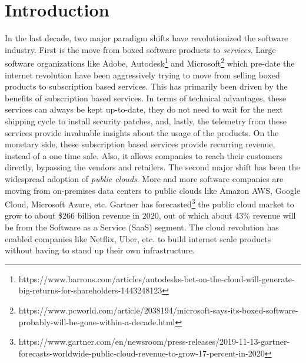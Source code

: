 \section{Introduction}
In the last decade, two major paradigm shifts have revolutionized the software industry. First is the move from boxed software products to \emph{services}. Large software organizations like Adobe\iffalse\footnote{https://producthabits.com/adobe-95-billion-saas-company/}\fi, Autodesk\footnote{https://www.barrons.com/articles/autodesks-bet-on-the-cloud-will-generate-big-returns-for-shareholders-1443248123} and Microsoft\footnote{https://www.pcworld.com/article/2038194/microsoft-says-its-boxed-software-probably-will-be-gone-within-a-decade.html} which pre-date the internet revolution have been aggressively trying to move from selling boxed products to subscription based services. This has primarily been driven by the benefits of subscription based services. In terms of technical advantages, these services can always be kept up-to-date, they do not need to wait for the next shipping cycle to install security patches, and, lastly, the telemetry from these services provide invaluable insights about the usage of the products. On the monetary side, these subscription based services provide recurring revenue, instead of a one time sale. Also, it allows companies to reach their customers directly, bypassing the vendors and retailers. The second major shift has been the widespread adoption of \emph{public clouds}. More and more software companies are moving from on-premises data centers to public clouds like Amazon AWS, Google Cloud, Microsoft Azure, etc. Gartner has forecasted\footnote{https://www.gartner.com/en/newsroom/press-releases/2019-11-13-gartner-forecasts-worldwide-public-cloud-revenue-to-grow-17-percent-in-2020} the public cloud market to grow to about \$$266$ billion revenue in $2020$, out of which about 43\% revenue will be from the Software as a Service (SaaS) segment. The cloud revolution has enabled companies like Netflix, Uber, etc. to build internet scale products without having to stand up their own infrastructure.

